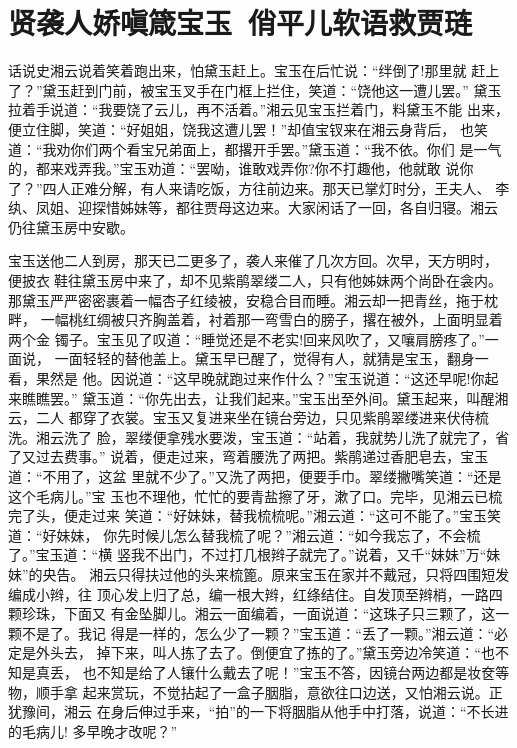 \chapter{贤袭人娇嗔箴宝玉~俏平儿软语救贾琏}

话说史湘云说着笑着跑出来，怕黛玉赶上。宝玉在后忙说：“绊倒了!那里就
赶上了？”黛玉赶到门前，被宝玉叉手在门框上拦住，笑道：“饶他这一遭儿罢。”
黛玉拉着手说道：“我要饶了云儿，再不活着。”湘云见宝玉拦着门，料黛玉不能
出来，便立住脚，笑道：“好姐姐，饶我这遭儿罢！”却值宝钗来在湘云身背后，
也笑道：“我劝你们两个看宝兄弟面上，都撂开手罢。”黛玉道：“我不依。你们
是一气的，都来戏弄我。”宝玉劝道：“罢呦，谁敢戏弄你?你不打趣他，他就敢
说你了？”四人正难分解，有人来请吃饭，方往前边来。那天已掌灯时分，王夫人、
李纨、凤姐、迎探惜姊妹等，都往贾母这边来。大家闲话了一回，各自归寝。湘云
仍往黛玉房中安歇。

宝玉送他二人到房，那天已二更多了，袭人来催了几次方回。次早，天方明时，
便披衣鞋往黛玉房中来了，却不见紫鹃翠缕二人，只有他姊妹两个尚卧在衾内。
那黛玉严严密密裹着一幅杏子红绫被，安稳合目而睡。湘云却一把青丝，拖于枕畔，
一幅桃红绸被只齐胸盖着，衬着那一弯雪白的膀子，撂在被外，上面明显着两个金
镯子。宝玉见了叹道：“睡觉还是不老实!回来风吹了，又嚷肩膀疼了。”一面说，
一面轻轻的替他盖上。黛玉早已醒了，觉得有人，就猜是宝玉，翻身一看，果然是
他。因说道：“这早晚就跑过来作什么？”宝玉说道：“这还早呢!你起来瞧瞧罢。”
黛玉道：“你先出去，让我们起来。”宝玉出至外间。黛玉起来，叫醒湘云，二人
都穿了衣裳。宝玉又复进来坐在镜台旁边，只见紫鹃翠缕进来伏侍梳洗。湘云洗了
脸，翠缕便拿残水要泼，宝玉道：“站着，我就势儿洗了就完了，省了又过去费事。”
说着，便走过来，弯着腰洗了两把。紫鹃递过香肥皂去，宝玉道：“不用了，这盆
里就不少了。”又洗了两把，便要手巾。翠缕撇嘴笑道：“还是这个毛病儿。”宝
玉也不理他，忙忙的要青盐擦了牙，漱了口。完毕，见湘云已梳完了头，便走过来
笑道：“好妹妹，替我梳梳呢。”湘云道：“这可不能了。”宝玉笑道：“好妹妹，
你先时候儿怎么替我梳了呢？”湘云道：“如今我忘了，不会梳了。”宝玉道：“横
竖我不出门，不过打几根辫子就完了。”说着，又千“妹妹”万“妹妹”的央告。
湘云只得扶过他的头来梳篦。原来宝玉在家并不戴冠，只将四围短发编成小辫，往
顶心发上归了总，编一根大辫，红绦结住。自发顶至辫梢，一路四颗珍珠，下面又
有金坠脚儿。湘云一面编着，一面说道：“这珠子只三颗了，这一颗不是了。我记
得是一样的，怎么少了一颗？”宝玉道：“丢了一颗。”湘云道：“必定是外头去，
掉下来，叫人拣了去了。倒便宜了拣的了。”黛玉旁边冷笑道：“也不知是真丢，
也不知是给了人镶什么戴去了呢！”宝玉不答，因镜台两边都是妆奁等物，顺手拿
起来赏玩，不觉拈起了一盒子胭脂，意欲往口边送，又怕湘云说。正犹豫间，湘云
在身后伸过手来，“拍”的一下将胭脂从他手中打落，说道：“不长进的毛病儿!
多早晚才改呢？”

